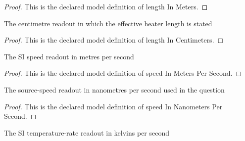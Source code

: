 \begin{proof}
  This is the declared model definition of length In Meters.
\end{proof}
\begin{definition}
  \label{def:physics:phyx-mini-0156:phyxminiproblems-problemphyxmini0156-lengthincentimeters}
  The centimetre readout in which the effective heater length is stated
\end{definition}
\begin{proof}
  This is the declared model definition of length In Centimeters.
\end{proof}
\begin{definition}
  \label{def:physics:phyx-mini-0156:phyxminiproblems-problemphyxmini0156-speedinmeterspersecond}
  The SI speed readout in metres per second
\end{definition}
\begin{proof}
  This is the declared model definition of speed In Meters Per Second.
\end{proof}
\begin{definition}
  \label{def:physics:phyx-mini-0156:phyxminiproblems-problemphyxmini0156-speedinnanometerspersecond}
  The source-speed readout in nanometres per second used in the question
\end{definition}
\begin{proof}
  This is the declared model definition of speed In Nanometers Per Second.
\end{proof}
\begin{definition}
  \label{def:physics:phyx-mini-0156:phyxminiproblems-problemphyxmini0156-temperaturerateinkelvinspersecond}
  The SI temperature-rate readout in kelvins per second
\end{definition}
